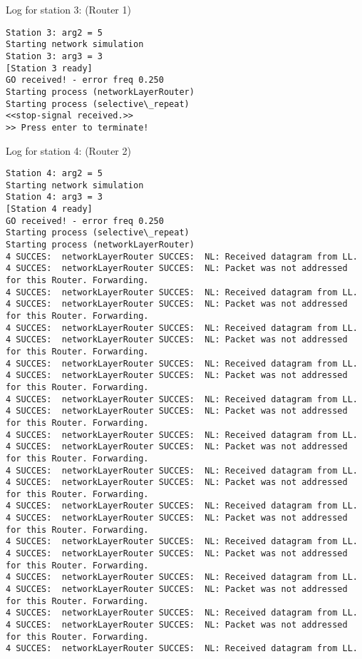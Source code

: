 Log for station 3: (Router 1)
\begin{lstlisting}[breaklines=true]
Station 3: arg2 = 5
Starting network simulation
Station 3: arg3 = 3
[Station 3 ready]
GO received! - error freq 0.250
Starting process (networkLayerRouter)
Starting process (selective\_repeat)
<<stop-signal received.>>
>> Press enter to terminate!
\end{lstlisting}

Log for station 4: (Router 2)
\begin{lstlisting}[breaklines=true]
Station 4: arg2 = 5
Starting network simulation
Station 4: arg3 = 3
[Station 4 ready]
GO received! - error freq 0.250
Starting process (selective\_repeat)
Starting process (networkLayerRouter)
4 SUCCES:  networkLayerRouter SUCCES:  NL: Received datagram from LL.
4 SUCCES:  networkLayerRouter SUCCES:  NL: Packet was not addressed for this Router. Forwarding.
4 SUCCES:  networkLayerRouter SUCCES:  NL: Received datagram from LL.
4 SUCCES:  networkLayerRouter SUCCES:  NL: Packet was not addressed for this Router. Forwarding.
4 SUCCES:  networkLayerRouter SUCCES:  NL: Received datagram from LL.
4 SUCCES:  networkLayerRouter SUCCES:  NL: Packet was not addressed for this Router. Forwarding.
4 SUCCES:  networkLayerRouter SUCCES:  NL: Received datagram from LL.
4 SUCCES:  networkLayerRouter SUCCES:  NL: Packet was not addressed for this Router. Forwarding.
4 SUCCES:  networkLayerRouter SUCCES:  NL: Received datagram from LL.
4 SUCCES:  networkLayerRouter SUCCES:  NL: Packet was not addressed for this Router. Forwarding.
4 SUCCES:  networkLayerRouter SUCCES:  NL: Received datagram from LL.
4 SUCCES:  networkLayerRouter SUCCES:  NL: Packet was not addressed for this Router. Forwarding.
4 SUCCES:  networkLayerRouter SUCCES:  NL: Received datagram from LL.
4 SUCCES:  networkLayerRouter SUCCES:  NL: Packet was not addressed for this Router. Forwarding.
4 SUCCES:  networkLayerRouter SUCCES:  NL: Received datagram from LL.
4 SUCCES:  networkLayerRouter SUCCES:  NL: Packet was not addressed for this Router. Forwarding.
4 SUCCES:  networkLayerRouter SUCCES:  NL: Received datagram from LL.
4 SUCCES:  networkLayerRouter SUCCES:  NL: Packet was not addressed for this Router. Forwarding.
4 SUCCES:  networkLayerRouter SUCCES:  NL: Received datagram from LL.
4 SUCCES:  networkLayerRouter SUCCES:  NL: Packet was not addressed for this Router. Forwarding.
4 SUCCES:  networkLayerRouter SUCCES:  NL: Received datagram from LL.
4 SUCCES:  networkLayerRouter SUCCES:  NL: Packet was not addressed for this Router. Forwarding.
4 SUCCES:  networkLayerRouter SUCCES:  NL: Received datagram from LL.

\end{lstlisting}

